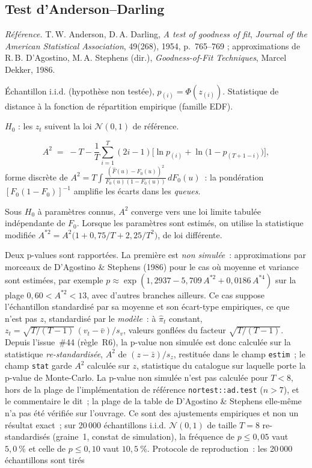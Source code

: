 \documentclass[a4paper,11pt]{article}
\newcommand{\code}[1]{\texttt{\small #1}}
\newcommand{\refl}[1]{{\small\textcolor{maincolor!70!black}{\textit{Référence.} #1}}\par\smallskip}
\newcounter{ficheid}
\newenvironment{fiche}[1]{%
  \stepcounter{ficheid}%
  \phantomsection
  \subsection{#1}%
  \label{fiche:\theficheid}%
}{%
  \end{description}\vspace{0.5em}%
}
\newcommand{\Cadre}{%
  \begin{description}[leftmargin=0pt, style=unboxed, itemsep=3pt, topsep=3pt, parsep=2pt]%
  \item[\textcolor{financeblue}{\textbf{1. Cadre, notations et hypothèses de validité (non testées).}}]}
\newcommand{\Hzero}{\item[\textcolor{financeblue}{\textbf{2. Hypothèse nulle.}}]}
\newcommand{\Stat}{\item[\textcolor{financeblue}{\textbf{3. Statistique de test.}}]}
\newcommand{\Loi}{\item[\textcolor{financeblue}{\textbf{4. Loi sous $H_0$.}}]}
\newcommand{\Pval}{\item[\textcolor{financeblue}{\textbf{5. p-value.}}]}
\begin{document}
\begin{fiche}{Test d'Anderson--Darling}
\label{fiche:anderson-darling}%
\refl{T.\,W. Anderson, D.\,A. Darling, \emph{A test of goodness of fit}, \emph{Journal of the
American Statistical Association}, 49(268), 1954, p.~765--769 ; approximations de
R.\,B. D'Agostino, M.\,A. Stephens (dir.), \emph{Goodness-of-Fit Techniques}, Marcel Dekker,
1986.}
\Cadre
Échantillon i.i.d. (hypothèse non testée), $p_{(i)} = \Phi(z_{(i)})$. Statistique de distance à la
fonction de répartition empirique (famille EDF).
\Hzero
$H_0$ : les $z_t$ suivent la loi $\mathcal{N}(0,1)$ de référence.
\Stat
\[
  A^2 \;=\; -T - \frac{1}{T}\sum_{i=1}^{T} (2i-1)\Big[\ln p_{(i)} + \ln\big(1 - p_{(T+1-i)}\big)\Big],
\]
forme discrète de
$A^2 = T\int \frac{(\hat F(u)-F_0(u))^2}{F_0(u)(1-F_0(u))}\,dF_0(u)$~: la pondération
$[F_0(1-F_0)]^{-1}$ amplifie les écarts dans les \emph{queues}.
\Loi
Sous $H_0$ à paramètres connus, $A^2$ converge vers une loi limite tabulée indépendante de $F_0$.
Lorsque les paramètres sont estimés, on utilise la statistique modifiée
$A^{*2} = A^2\big(1 + 0{,}75/T + 2{,}25/T^2\big)$, de loi différente.
\Pval
Deux p-values sont rapportées. La première est \emph{non simulée}~: approximations par
morceaux de D'Agostino \& Stephens (1986) pour le cas où moyenne et variance sont estimées, par
exemple $p \approx \exp(1{,}2937 - 5{,}709\,A^{*2} + 0{,}0186\,A^{*4})$ sur la plage
$0{,}60 < A^{*2} < 13$, avec d'autres branches ailleurs. Ce cas suppose l'échantillon standardisé
par sa moyenne et son écart-type empiriques, ce que n'est pas $z$, standardisé par le
\emph{modèle}~: à $\hat\pi_t$ constant, $z_t = \sqrt{T/(T-1)}\,(v_t - \bar v)/s_v$, valeurs
gonflées du facteur $\sqrt{T/(T-1)}$. Depuis l'issue~\#44 (règle~R6), la p-value non simulée est
donc calculée sur la statistique \emph{re-standardisée}, $A^2$ de $(z - \bar z)/s_z$, restituée
dans le champ \code{estim}~; le champ \code{stat} garde $A^2$ calculée sur $z$, statistique du
catalogue sur laquelle porte la p-value de Monte-Carlo. La p-value non simulée n'est pas calculée
pour $T < 8$, hors de la plage de l'implémentation de référence \code{nortest::ad.test} ($n > 7$),
et le commentaire le dit~; la plage de la table de D'Agostino \& Stephens elle-même n'a pas été
vérifiée sur l'ouvrage. Ce sont des ajustements empiriques et non un résultat exact~; sur
20\,000 échantillons i.i.d. $\mathcal{N}(0,1)$ de taille $T = 8$ re-standardisés (graine~1,
constat de simulation), la fréquence de $p \le 0{,}05$ vaut $5{,}0~\%$ et celle de $p \le 0{,}10$
vaut $10{,}5~\%$. Protocole de reproduction~: les 20\,000 échantillons sont tirés

\end{fiche}
\end{document}
